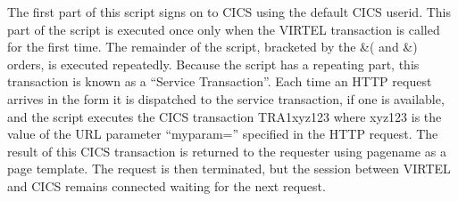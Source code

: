 \documentclass[letterpaper,10pt,english]{sphinxmanual}
\begin{document}
\begin{sphinxVerbatim}[commandchars=\\\{\}]
                          
                         
      
                      
                          
                                 
     
         
\end{sphinxVerbatim}

\sphinxAtStartPar
{}

\sphinxAtStartPar
The first part of this script signs on to CICS using the default CICS userid. This part of the script is executed once only when the VIRTEL transaction is called for the first time. The remainder of the script, bracketed by the \&( and \&) orders, is executed repeatedly. Because the script has a repeating part, this transaction is known as a “Service Transaction”. Each time an HTTP request arrives in the form  it is dispatched to the service transaction, if one is available, and the script executes the CICS transaction TRA1xyz123 where xyz123 is the value of the URL parameter “myparam=” specified in the HTTP request. The result of this CICS transaction is returned to the requester using pagename as a page template. The request is then terminated, but the session between VIRTEL and CICS remains connected waiting for the next request.
\end{document}
